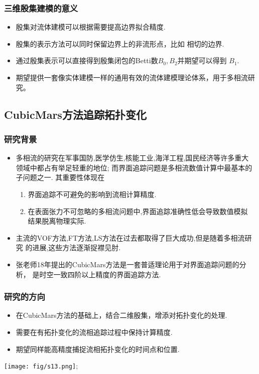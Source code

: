 \documentclass[UTF8]{ctexbeamer}	%
\theoremstyle{plain}
\theoremstyle{definition}
\theoremstyle{remark}
\numberwithin{equation}{section}
\begin{document}
\begin{frame}
    \frametitle{三维殷集建模的意义}
    \begin{itemize}
        \item 殷集对流体建模可以根据需要提高边界拟合精度.
        \item 殷集的表示方法可以同时保留边界上的非流形点，比如
        相切的边界.
        \item 通过殷集表示可以直接得到殷集闭包的Betti数$B_0, B_2$并期望可以得到
        $B_1$.
        \item 期望提供一套像实体建模一样的通用有效的流体建模理论体系，用于多相流研究。
    \end{itemize}
\end{frame}

\subsection{CubicMars方法追踪拓扑变化}
\begin{frame}
    \frametitle{研究背景}
    \begin{itemize}
        \item 多相流的研究在军事国防,医学仿生,核能工业,海洋工程,国民经济等许多重大
        领域中都占有举足轻重的地位; 而界面追踪问题是多相流数值计算中最基本的子问题之一.
        其重要性体现在
        \begin{enumerate}
            \item 界面追踪不可避免的影响到流相计算精度.
            \item 在表面张力不可忽略的多相流问题中,界面追踪准确性低会导致数值模拟
            结果脱离物理实际.
        \end{enumerate}
        \item 主流的VOF方法,FT方法,LS方法在过去都取得了巨大成功,但是随着多相流研究
        的进展,这些方法逐渐捉襟见肘.
        \item 张老师18年提出的CubicMars方法是一套普适理论用于对界面追踪问题的分析，
        是时空一致四阶以上精度的界面追踪方法.
    \end{itemize}
    
\end{frame}

\begin{frame}
    \frametitle{研究的方向} 
    \begin{itemize}
        \item 在CubicMars方法的基础上，结合二维殷集，增添对拓扑变化的处理.
        \item 需要在有拓扑变化的流相追踪过程中保持计算精度.
        \item 期望同样能高精度捕捉流相拓扑变化的时间点和位置.
    \end{itemize}
    \centering
    \texttt{[image: fig/s13.png]};
\end{frame}
\end{document}

